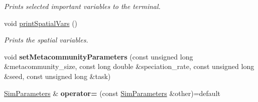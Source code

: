 \begin{DoxyCompactItemize}
\begin{DoxyCompactList}\small\item\em Prints selected important variables to the terminal. \end{DoxyCompactList}\item 
void \hyperlink{struct_sim_parameters_a04636fc2b0899400011b54bb1f175eb0}{print\+Spatial\+Vars} ()\hypertarget{struct_sim_parameters_a04636fc2b0899400011b54bb1f175eb0}{}\label{struct_sim_parameters_a04636fc2b0899400011b54bb1f175eb0}

\begin{DoxyCompactList}\small\item\em Prints the spatial variables. \end{DoxyCompactList}\item 
void {\bfseries set\+Metacommunity\+Parameters} (const unsigned long \&metacommunity\+\_\+size, const long double \&speciation\+\_\+rate, const unsigned long \&seed, const unsigned long \&task)\hypertarget{struct_sim_parameters_a3f702a94e97b5dee554574b95ac10987}{}\label{struct_sim_parameters_a3f702a94e97b5dee554574b95ac10987}

\item 
\hyperlink{struct_sim_parameters}{Sim\+Parameters} \& {\bfseries operator=} (const \hyperlink{struct_sim_parameters}{Sim\+Parameters} \&other)=default\hypertarget{struct_sim_parameters_ab774f2f5f6221536fcadeb2436abda57}{}\label{struct_sim_parameters_ab774f2f5f6221536fcadeb2436abda57}

\end{DoxyCompactItemize}
